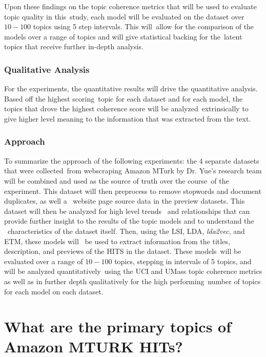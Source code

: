 \documentclass[letterpaper,12pt]{article}
\begin{document}

Upon these findings on the topic coherence metrics that will be used to evaluate topic quality in this\
study, each model will be evaluated on the dataset over $10-100$ topics using 5 step intervals. This will\
allow for the comparison of the models over a range of topics and will give statistical backing for the\
latent topics that receive further in-depth analysis.

\subsection{Qualitative Analysis}
For the experiments, the quantitative results will drive the quantitative analysis. Based off the highest scoring\
topic for each dataset and for each model, the topics that drove the highest coherence score will be analyzed\
extrinsically to give higher level meaning to the information that was extracted from the text.

\subsection{Approach}
To summarize the approach of the following experiments: the 4 separate datasets that were collected\
from webscraping Amazon MTurk by Dr. Yue's research team will be combined and used as the source of truth over the course\
of the experiment. This dataset will then preprocess to remove stopwords and document duplicates, as well a \
website page source data in the preview datasets. This dataset will then be analyzed for high level trends \
and relationships that can provide further insight to the results of the topic models and to understand the \
characteristics of the dataset itself. Then, using the LSI, LDA, \emph{lda2vec}, and ETM, these models will \
be used to extract information from the titles, description, and previews of the HITS in the dataset. These models\
will be evaluated over a range of $10-100$ topics, stepping in intervals of 5 topics, and will be analyzed quantitatively\
using the UCI and UMass topic coherence metrics as well as in further depth qualitatively for the high performing\
number of topics for each model on each dataset. 

\chapter{What are the primary topics of Amazon MTURK HITs?}
\end{document}
